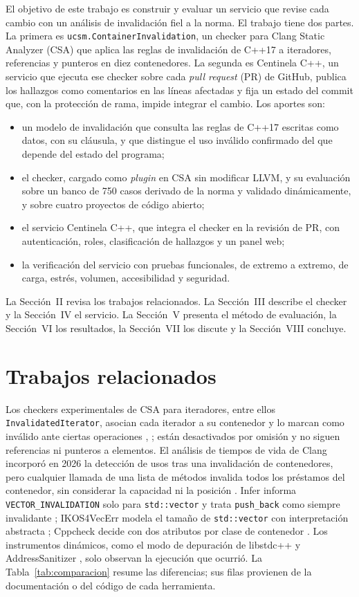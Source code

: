 \documentclass[conference]{IEEEtran}
\newcommand{\code}[1]{\texttt{#1}}
\begin{document}
El objetivo de este trabajo es construir y evaluar un servicio que revise cada cambio con un análisis de invalidación fiel a la norma. El trabajo tiene dos partes. La primera es \code{ucsm.ContainerInvalidation}, un checker para Clang Static Analyzer (CSA) que aplica las reglas de invalidación de C++17 a iteradores, referencias y punteros en diez contenedores. La segunda es Centinela C++, un servicio que ejecuta ese checker sobre cada \textit{pull request} (PR) de GitHub, publica los hallazgos como comentarios en las líneas afectadas y fija un estado del commit que, con la protección de rama, impide integrar el cambio. Los aportes son:
\begin{itemize}
\item un modelo de invalidación que consulta las reglas de C++17 escritas como datos, con su cláusula, y que distingue el uso inválido confirmado del que depende del estado del programa;
\item el checker, cargado como \textit{plugin} en CSA sin modificar LLVM, y su evaluación sobre un banco de 750 casos derivado de la norma y validado dinámicamente, y sobre cuatro proyectos de código abierto;
\item el servicio Centinela C++, que integra el checker en la revisión de PR, con autenticación, roles, clasificación de hallazgos y un panel web;
\item la verificación del servicio con pruebas funcionales, de extremo a extremo, de carga, estrés, volumen, accesibilidad y seguridad.
\end{itemize}

La Sección~II revisa los trabajos relacionados. La Sección~III describe el checker y la Sección~IV el servicio. La Sección~V presenta el método de evaluación, la Sección~VI los resultados, la Sección~VII los discute y la Sección~VIII concluye.

\section{Trabajos relacionados}

Los checkers experimentales de CSA para iteradores, entre ellos \code{InvalidatedIterator}, asocian cada iterador a su contenedor y lo marcan como inválido ante ciertas operaciones \cite{csadoc}, \cite{balogh18}; están desactivados por omisión y no siguen referencias ni punteros a elementos. El análisis de tiempos de vida de Clang incorporó en 2026 la detección de usos tras una invalidación de contenedores, pero cualquier llamada de una lista de métodos invalida todos los préstamos del contenedor, sin considerar la capacidad ni la posición \cite{saxena26}. Infer informa \code{VECTOR\_INVALIDATION} solo para \code{std::vector} y trata \code{push\_back} como siempre invalidante \cite{infer}; IKOS4VecErr modela el tamaño de \code{std::vector} con interpretación abstracta \cite{liu25}; Cppcheck decide con dos atributos por clase de contenedor \cite{cppcheck}. Los instrumentos dinámicos, como el modo de depuración de libstdc++ \cite{libstdcxx} y AddressSanitizer \cite{asan}, solo observan la ejecución que ocurrió. La Tabla~\ref{tab:comparacion} resume las diferencias; sus filas provienen de la documentación o del código de cada herramienta.
\end{document}
